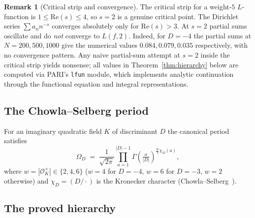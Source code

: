 \documentclass[12pt]{amsart}
\theoremstyle{definition}
\newtheorem{remark}[theorem]{Remark}
\newcommand{\OK}{\mathcal{O}_K}
\begin{document}
\begin{remark}[Critical strip and convergence]\label{rmk:strip}
The critical strip for a weight-$5$ $L$-function is
$1 \leq \mathrm{Re}(s) \leq 4$, so $s = 2$ is a genuine critical
point. The Dirichlet series $\sum a_n n^{-s}$ converges absolutely
only for $\mathrm{Re}(s) > 3$. At $s = 2$ partial sums oscillate and
do \emph{not} converge to $L(f,2)$. Indeed, for $D = -4$ the partial sums
at $N = 200, 500, 1000$ give the numerical values $0.084, 0.079, 0.035$
respectively, with no convergence pattern. Any naive partial-sum
attempt at $s=2$ inside the critical strip yields nonsense; all values
in Theorem~\ref{thm:hierarchy} below are computed via PARI's
\texttt{lfun} module, which implements analytic continuation through
the functional equation and integral representations.
\end{remark}

\subsection{The Chowla--Selberg period}

For an imaginary quadratic field $K$ of discriminant $D$ the canonical
period satisfies
\begin{equation}\label{eq:CS}
  \Omega_D \;=\; \frac{1}{\sqrt{2\pi}} \prod_{a=1}^{|D|-1}
    \Gamma\!\left(\tfrac{a}{|D|}\right)^{\frac{w}{4}\chi_D(a)},
\end{equation}
where $w = |\OK^\times| \in \{2,4,6\}$ ($w=4$ for $D=-4$, $w=6$ for
$D=-3$, $w=2$ otherwise) and $\chi_D = (D/\cdot)$ is the Kronecker
character (Chowla--Selberg~\cite{ChowlaSelberg1949}).

\subsection{The proved hierarchy}
\label{ssec:proved-hierarchy}
\end{document}
